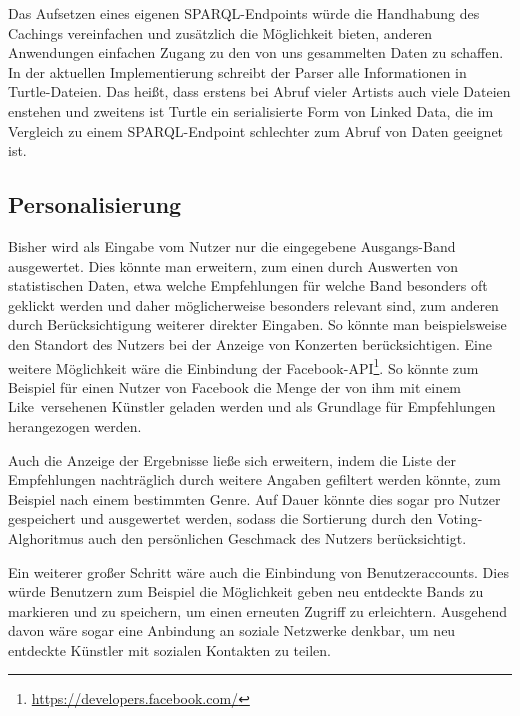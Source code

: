 Das Aufsetzen eines eigenen SPARQL-Endpoints würde die Handhabung des Cachings vereinfachen und zusätzlich die Möglichkeit bieten, anderen Anwendungen einfachen Zugang zu den von uns gesammelten Daten zu schaffen. In der aktuellen Implementierung schreibt der Parser alle Informationen in Turtle-Dateien. Das heißt, dass erstens bei Abruf vieler Artists auch viele Dateien enstehen und zweitens ist Turtle ein serialisierte Form von Linked Data, die im Vergleich zu einem SPARQL-Endpoint schlechter zum Abruf von Daten geeignet ist. 


\subsection{Personalisierung}
Bisher wird als Eingabe vom Nutzer nur die eingegebene Ausgangs-Band ausgewertet. Dies könnte man erweitern, zum einen durch Auswerten von statistischen Daten, etwa welche Empfehlungen für welche Band besonders oft geklickt werden und daher möglicherweise besonders relevant sind, zum anderen durch Berücksichtigung weiterer direkter Eingaben. So könnte man beispielsweise den Standort des Nutzers bei der Anzeige von Konzerten berücksichtigen. Eine weitere Möglichkeit wäre die Einbindung der Facebook-API\footnote{\url{https://developers.facebook.com/}}. So könnte zum Beispiel für einen Nutzer von Facebook die Menge der von ihm mit einem \glqq Like\grqq \ versehenen Künstler geladen werden und als Grundlage für Empfehlungen herangezogen werden.

Auch die Anzeige der Ergebnisse ließe sich erweitern, indem die Liste der Empfehlungen nachträglich durch weitere Angaben gefiltert werden könnte, zum Beispiel nach einem bestimmten Genre. Auf Dauer könnte dies sogar pro Nutzer gespeichert und ausgewertet werden, sodass die Sortierung durch den Voting-Alghoritmus auch den persönlichen Geschmack des Nutzers berücksichtigt.

Ein weiterer großer Schritt wäre auch die Einbindung von Benutzeraccounts. Dies würde Benutzern zum Beispiel die Möglichkeit geben neu entdeckte Bands zu markieren und zu speichern, um einen erneuten Zugriff zu erleichtern. Ausgehend davon wäre sogar eine Anbindung an soziale Netzwerke denkbar, um neu entdeckte Künstler mit sozialen Kontakten zu teilen.
